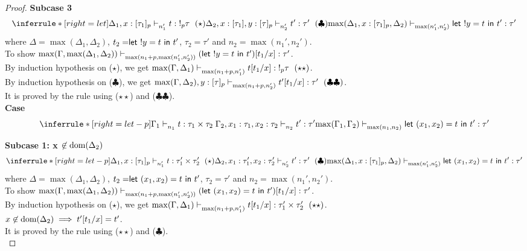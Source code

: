 \documentclass{article}
\begin{document}
\begin{proof}
\textbf{Subcase 3 }
\[
   \inferrule*[ right = let ]
   {\Delta_1, x:[\tau_1]_p \jtype{n_1'}{}{t}{!_p \tau}~(\star) \\ \Delta_2, x: [\tau_1], y: [\tau]_p \jtype{n_2'}{}{t'}{\tau'}~(\clubsuit)}
   {  \max(\Delta_1, x: [\tau_1]_p, \Delta_2) \jtype{\max(n_1',n_2')}{}{\letx{!y}{t}{t'}}{\tau'}  }
\]
where $\Delta = \max(\Delta_1, \Delta_2)$, $t_2 =\mathrel{ \mathsf{let}\ {!y} = {t} \ \mathsf{in} \ {t'} }$, $\tau_2 = \tau'$ and $n_2 = \max(n_1', n_2')$.\\
To show $ \max(\Gamma, \max(\Delta_1,\Delta_2) ) \mathrel{\vdash_{\max(n_1 + p,\max(n_1',n_2') )}^{} {  (\mathrel{ \mathsf{let}\ {!y} = {t} \ \mathsf{in} \ {t'} })[t_1/x] } : {\tau'}}  $. \\
By induction hypothesis on ($\star$), we get $\max(\Gamma, \Delta_1) \jtype{\max(n_1 + p,n_1') }{}{t[t_1/x]}{!_p \tau}~(\star\star) $. \\
By induction hypothesis on ($\clubsuit$), we get $\max(\Gamma, \Delta_2),y:[\tau]_p \mathrel{\vdash_{\max(n_1 + p,n_2') }^{} {t'[t_1/x]} : {\tau'}}~(\clubsuit\clubsuit) $. \\
It is proved by the rule  using ($\star\star$) and ($\clubsuit\clubsuit$).\\

\noindent \textbf{Case} 
$$
   \inferrule*[ right = let-p ]
   {\Gamma_1 \jtype{n_1}{}{t}{\tau_1 \times \tau_2 } \\ \Gamma_2, x_1: \tau_1, x_2 : \tau_2 \jtype{n_2}{}{t'}{\tau'}}
   { \max(\Gamma_1, \Gamma_2)  \jtype{\max(n_1,n_2)}{}{ \letx{(x_1,x_2)}{t}{t'} }{\tau'}  }
$$

\textbf{Subcase 1: x $\not \in \text{dom}(\Delta_2)$ }
\[
   \inferrule*[ right = let-p ]
   {\Delta_1, x: [\tau_1]_p \jtype{n_1'}{}{t}{\tau_1' \times \tau_2'}~(\star) \\ \Delta_2, x_1:\tau_1', x_2: \tau_2' \jtype{n_2'}{}{t'}{\tau'}~(\clubsuit)}
   {  \max(\Delta_1, x: [\tau_1]_p, \Delta_2) \jtype{\max(n_1',n_2')}{}{\letx{(x_1,x_2)}{t}{t'}}{\tau'}  }
\]
where $\Delta = \max(\Delta_1,\Delta_2)$, $t_2 = \mathrel{ \mathsf{let}\ {(x_1,x_2)} = {t} \ \mathsf{in} \ {t'} }$, $\tau_2 = \tau'$ and $n_2 =\max(n_1',n_2')$. \\
To show $ \max(\Gamma, \max(\Delta_1,\Delta_2) ) \mathrel{\vdash_{\max(n_1 + p,\max(n_1',n_2') )}^{} {  (\mathrel{ \mathsf{let}\ {(x_1,x_2)} = {t} \ \mathsf{in} \ {t'} })[t_1/x] } : {\tau'}}  $. \\
By induction hypothesis on ($\star$), we get $\max(\Gamma, \Delta_1) \jtype{\max(n_1 + p, n_1') }{}{t[t_1/x]}{\tau_1' \times \tau_2'}~(\star\star) $. \\
 $x \not \in \text{dom}(\Delta_2) \implies t'[t_1/x] =  t'$.\\
 It is proved by the rule  using ($\star\star$) and ($\clubsuit$).\\


\end{proof}
\end{document}

